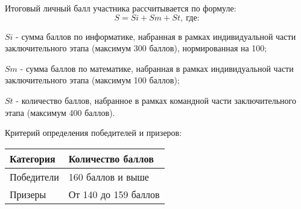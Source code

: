 Итоговый личный балл участника рассчитывается по формуле:
$$S = Si + Sm + St, \: \text{где:}$$
 
$Si$ - сумма баллов по информатике, набранная в рамках индивидуальной части заключительного этапа (максимум 300 баллов), нормированная на 100;

$Sm$ - сумма баллов по математике, набранная в рамках индивидуальной части заключительного этапа (максимум 100 баллов); 

$St$ - количество баллов, набранное в рамках командной части заключительного этапа (максимум 400 баллов).

Критерий определения победителей и призеров:
\begin{center}
    \begin{tabular}{|l|l|}
        \hline
        Категория&Количество баллов\\
        \hline
        Победители&160 баллов и выше\\
        \hline
        Призеры&От 140 до 159 баллов\\
        \hline
    \end{tabular}
\end{center}